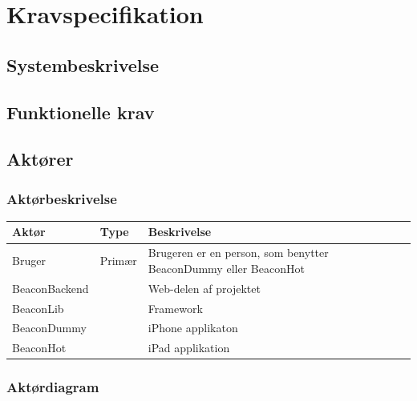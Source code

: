 \chapter{Kravspecifikation}
\label{ch:kravspecifikation}

\section{Systembeskrivelse}

\section{Funktionelle krav}
\section{Aktører}
\subsection{Aktørbeskrivelse}

\begin{table}[h]
\begin{tabular}{@{}lll@{}}
\toprule
\textbf{Aktør} & \textbf{Type} & \textbf{Beskrivelse}                                          \\ \midrule
Bruger         & Primær        & Brugeren er en person, som benytter BeaconDummy eller BeaconHot \\ \midrule
BeaconBackend  &               & Web-delen af projektet                                        \\ \midrule
BeaconLib      &               & Framework                                                     \\ \midrule
BeaconDummy    &               & iPhone applikaton                                             \\ \midrule
BeaconHot      &               & iPad applikation                                              \\ \bottomrule
\end{tabular}
\end{table}

\subsection{Aktørdiagram}
